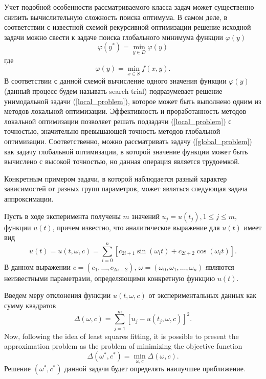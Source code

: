 \documentclass{svproc}
\begin{document}
Учет подобной особенности рассматриваемого класса задач может существенно снизить вычислительную сложность поиска оптимума. В самом деле, в соответствии с известной схемой рекурсивной оптимизации \cite{Carr} решение исходной задачи можно свести к задаче поиска глобального минимума функции $\varphi(y)$
\begin{equation}\label{global_problem}
\varphi(y^*) = \min_{y\in D}  \varphi (y)
\end{equation}
где 
\begin{equation}\label{local_problem}
\varphi(y) = \min_{x\in S} f(x,y).
\end{equation}
В соответствии с данной схемой вычисление одного значения функции $\varphi (y)$ (данный процесс будем называть search trial) подразумевает решение унимодальной задачи (\ref{local_problem}), которое может быть выполнено одним из методов локальной оптимизации. Эффективность и проработанность методов локальной оптимизации позволяет решать подзадачи (\ref{local_problem}) с точностью, значительно превышающей точность методов глобальной оптимизации. Соответственно, можно рассматривать задачу (\ref{global_problem}) как задачу глобальной оптимизации, в которой значение функции может быть вычислено с высокой точностью, но данная операция является трудоемкой. 

Конкретным примером задачи, в которой наблюдается разный характер зависимостей от разных групп параметров, может являться следующая задача аппроксимации.

Пусть в ходе эксперимента получены $m$ значений $u_j = u(t_j), 1 \leq j \leq m, $ функции $u(t)$, причем известно, что аналитическое выражение для  $u(t)$ имеет вид
\begin{equation}\label{ex_func}
u(t) = u(t,\omega,c)=\sum^{n}_{i=0}\left[c_{2i+1}\sin(\omega_it) + c_{2i+2}\cos(\omega_it)\right].	
\end{equation}
В данном выражении $c=\left(c_1,\ldots,c_{2n+2}\right)$, $\omega=\left(\omega_0,\omega_1,\ldots,\omega_n\right)$ являются неизвестными параметрами, определяющими конкретную функцию $u(t)$.

Введем меру отклонения функции $u(t,\omega,c)$ от экспериментальных данных как сумму квадратов
\[
\Delta(\omega,c)= \sum^{m}_{j=1}\left[u_j-u(t_j,\omega,c)\right]^2. 
\]
Now, following the idea of least squares fitting, it is possible to present the approximation problem as the problem of minimizing the objective function
\begin{equation}\label{ex_prob}
\Delta(\omega^*,c^*) = \min_{\omega,c} \Delta(\omega,c).	
\end{equation}
Решение $(\omega^*,c^*)$ данной задачи будет определять наилучшее приближение.
\end{document}
